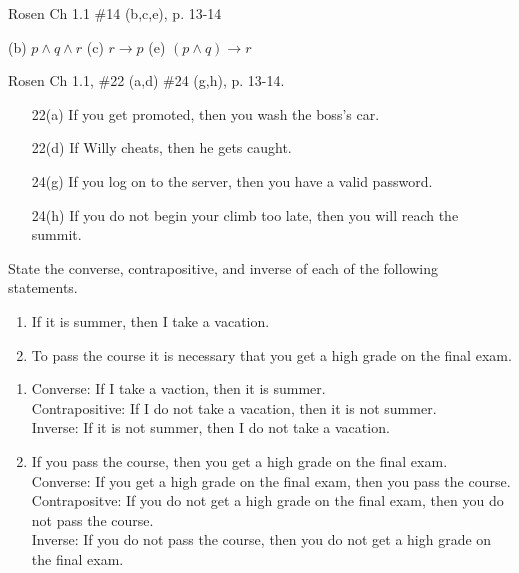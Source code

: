 \documentclass[11pt,addpoints]{exam}
\newcommand{\ra}{\rightarrow}
\begin{document}
\begin{questions}
\question[6] Rosen Ch 1.1 \#14 (b,c,e), p. 13-14
    \ifprintanswers
        \vspace{-15pt}
    \fi
    \begin{solution}
    	(b) $p \wedge q \wedge r$ \hfill (c) $r \ra p$ \hfill (e) $(p \wedge q) \ra r$ \hfill
    \end{solution}
    


\question[12] Rosen Ch 1.1, \#22 (a,d) \#24 (g,h), p. 13-14.
    \ifprintanswers
        \vspace{-15pt}
    \fi
    \begin{solution}
    \begin{itemize}[itemsep=0pt,parsep=0pt,
    topsep=0pt,partopsep=0pt]
        \item[22(a)] If you get promoted, then you wash the boss's car.
        \item[22(d)] If Willy cheats, then he gets caught.
        \item[24(g)] If you log on to the server, then you have a valid password.
        \item[24(h)] If you do not begin your climb too late, then you will reach the summit.
    \end{itemize}
    \end{solution}



\question[12] State the converse, contrapositive, and inverse of each of the following statements.
	\begin{enumerate}[label=(\alph*),itemsep=0pt,parsep=0pt,topsep=0pt,partopsep=0pt]
        \item If it is summer, then I take a vacation.
        \item To pass the course it is necessary that you get a high grade on the final exam.
    \end{enumerate}
    \ifprintanswers
        \vspace{-15pt}
    \fi
    \begin{solution}
    \begin{enumerate}[label=(\alph*),itemsep=0pt,parsep=0pt,topsep=0pt,partopsep=0pt]
        \item Converse: If I take a vaction, then it is summer. \\
        	Contrapositive: If I do not take a vacation, then it is not summer. \\
        	Inverse: If it is not summer, then I do not take a vacation. 
        \item If you pass the course, then you get a high grade on the final exam. \\
        	Converse: If you get a high grade on the final exam, then you pass the course. \\
        	Contrapositve: If you do not get a high grade on the final exam, then you do not pass the course. \\
        	Inverse: If you do not pass the course, then you do not get a high grade on the final exam.
    \end{enumerate}
    \end{solution}



\end{questions}
\end{document}
